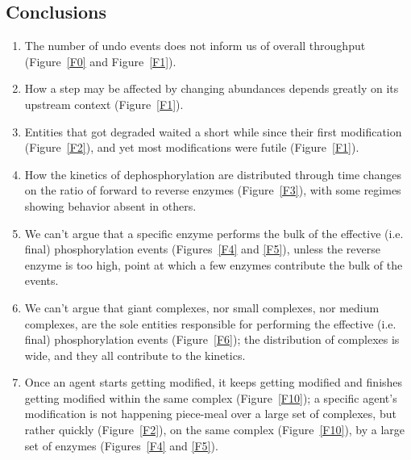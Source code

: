 \subsection{Conclusions}

\begin{enumerate}
\item The number of undo events does not inform us of overall
  throughput (Figure~\ref{F0} and Figure~\ref{F1}).
\item How a step may be affected by changing abundances depends
  greatly on its upstream context (Figure~\ref{F1}).
\item Entities that got degraded waited a short while since their
  first modification (Figure~\ref{F2}), and yet most modifications
  were futile (Figure~\ref{F1}).
\item How the kinetics of dephosphorylation are distributed through
  time changes on the ratio of forward to reverse enzymes
  (Figure~\ref{F3}), with some regimes showing behavior absent in
  others.
\item We can’t argue that a specific enzyme performs the bulk of the
  effective (i.e. final) phosphorylation events (Figures~\ref{F4} and
  \ref{F5}), unless the reverse enzyme is too high, point at which a
  few enzymes contribute the bulk of the events.
\item We can’t argue that giant complexes, nor small complexes, nor
  medium complexes, are the sole entities responsible for performing
  the effective (i.e. final) phosphorylation events
  (Figure~\ref{F6}); %
  the distribution of complexes is wide, and they all contribute to
  the kinetics.
\item Once an agent starts getting modified, it keeps getting modified
  and finishes getting modified within the same complex
  (Figure~\ref{F10}); %
  a specific agent’s modification is not happening piece-meal over a
  large set of complexes, but rather quickly (Figure~\ref{F2}), on the
  same complex (Figure~\ref{F10}), %
  by a large set of enzymes (Figures~\ref{F4} and \ref{F5}).
\end{enumerate}